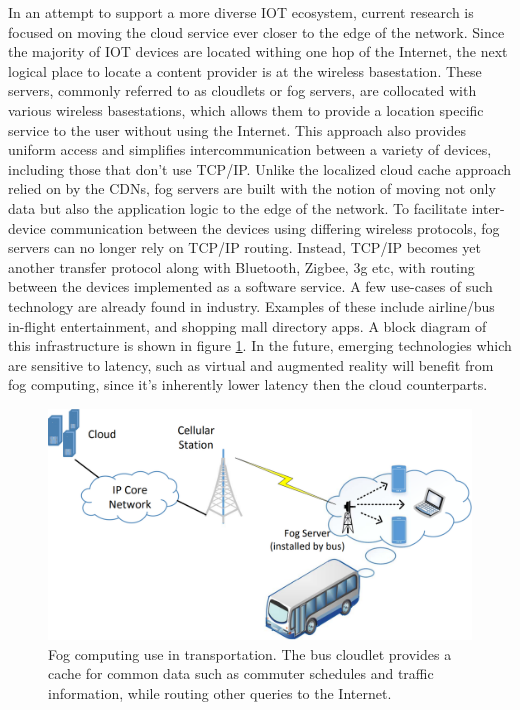 In an attempt to support a more diverse IOT ecosystem, current research is focused on moving the cloud service ever closer to the edge of the network.
Since the majority of IOT devices are located withing one hop of the Internet, the next logical place to locate a content provider is at the wireless basestation.\cite{satyanarayanan2017emergence} These servers, commonly referred to as cloudlets or fog servers, are collocated with various wireless basestations, which allows them to provide a location specific service to the user without using the Internet.
This approach also provides uniform access and simplifies intercommunication between a variety of devices, including those that don't use TCP/IP. Unlike the localized cloud cache approach relied on by the CDNs, fog servers are built with the notion of moving not only data but also the application logic to the edge of the network.
To facilitate inter-device communication between the devices using differing wireless protocols, fog servers can no longer rely on TCP/IP routing.
Instead, TCP/IP becomes yet another transfer protocol along with Bluetooth, Zigbee, 3g etc, with routing between the devices implemented as a software service.\cite{edgeiot} A few use-cases of such technology are already found in industry.
Examples of these include airline/bus in-flight entertainment, and shopping mall directory apps.
A block diagram of this infrastructure is shown in figure \ref{lit:fig:3}.
In the future, emerging technologies which are sensitive to latency, such as virtual and augmented reality will benefit from fog computing, since it's inherently lower latency then the cloud counterparts.

\begin{figure}[h]
    \centering
    \includegraphics[width=0.6\linewidth]{img/fog_comp.png}
    \caption{Fog computing use in transportation.
    The bus cloudlet provides a cache for common data such as commuter schedules and traffic information, while routing other queries to the Internet.\cite{edgeiot}}
    \label{lit:fig:3}
\end{figure}

